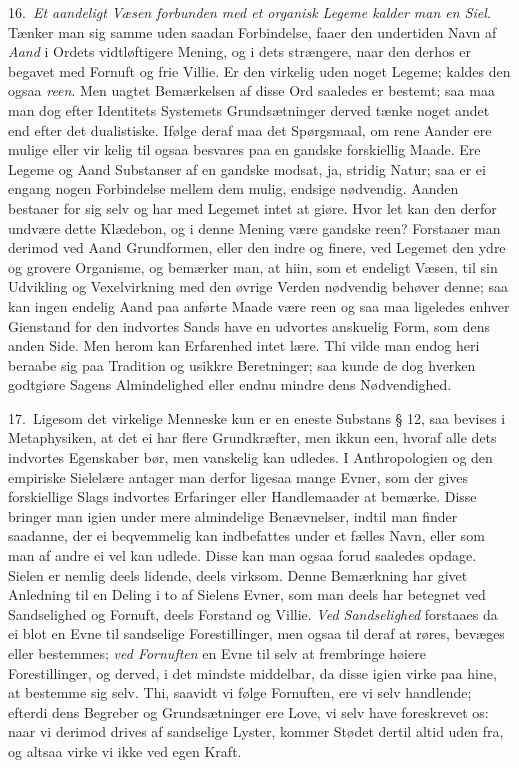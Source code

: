 \documentclass[12pt,a4paper]{article}
\newcommand{\opage}[1]{\marginnote{\footnotesize\textit{[#1]}}}
\begin{document}
16.~\emph{Et aandeligt Væsen forbunden med et organisk Legeme kalder man en Siel.}
Tænker man sig samme uden saadan Forbindelse, faaer den undertiden Navn af
\emph{Aand} i Ordets vidtløftigere Mening, og i dets strængere, naar den derhos er
begavet med Fornuft og frie Villie. Er den virkelig uden noget Legeme; kaldes den
ogsaa \emph{reen}. Men uagtet Bemærkelsen af disse Ord saaledes er bestemt; saa maa
man dog efter Identitets Systemets Grundsætninger derved tænke noget andet end
efter det dualistiske. Ifølge deraf maa det Spørgsmaal, om rene Aander ere mulige
eller vir%
\opage{30}kelig til ogsaa besvares paa en gandske forskiellig Maade. Ere Legeme og Aand
Substanser af en gandske modsat, ja, stridig Natur; saa er ei engang nogen
Forbindelse mellem dem mulig, endsige nødvendig. Aanden bestaaer for sig selv og
har med Legemet intet at giøre. Hvor let kan den derfor undvære dette Klædebon, og
i denne Mening være gandske reen? Forstaaer man derimod ved Aand Grundformen, eller
den indre og finere, ved Legemet den ydre og grovere Organisme, og bemærker man, at
hiin, som et endeligt Væsen, til sin Udvikling og Vexelvirkning med den øvrige
Verden nødvendig behøver denne; saa kan ingen endelig Aand paa anførte Maade være
reen og saa maa ligeledes enhver Gienstand for den indvortes Sands have en udvortes
anskuelig Form, som dens anden Side. Men herom kan Erfarenhed intet lære. Thi vilde
man endog heri beraabe sig paa Tradition og usikkre Beretninger; saa kunde de dog
hverken godtgiøre Sagens Almindelighed eller endnu mindre dens Nødvendighed.

17.~Ligesom det virkelige Menneske kun er en eneste Substans § 12, saa bevises i
Metaphysiken, at det ei har flere Grundkræfter, men ikkun een, hvoraf alle dets
indvortes Egenskaber bør, men vanskelig kan udledes. I Anthropologien og den
empiriske Sielelære antager man derfor ligesaa mange Evner, som der gives
forskiellige Slags indvortes Erfaringer eller Handlemaader at bemærke. Disse
bringer man igien under mere
\opage{31} almindelige Benævnelser, indtil man finder saadanne, der ei beqvemmelig kan
indbefattes under et fælles Navn, eller som man af andre ei vel kan udlede. Disse
kan man ogsaa forud saaledes opdage. Sielen er nemlig deels lidende, deels
virksom. Denne Bemærkning har givet Anledning til en Deling i to af Sielens Evner,
som man deels har betegnet ved Sandselighed og Fornuft, deels Forstand og Villie.
\emph{Ved Sandselighed} forstaaes da ei blot en Evne til sandselige
Forestillinger, men ogsaa til deraf at røres, bevæges eller bestemmes; \emph{ved
Fornuften} en Evne til selv at frembringe høiere Forestillinger, og derved, i det
mindste middelbar, da disse igien virke paa hine, at bestemme sig selv. Thi,
saavidt vi følge Fornuften, ere vi selv handlende; efterdi dens Begreber og
Grundsætninger ere Love, vi selv have foreskrevet os: naar vi derimod drives af
sandselige Lyster, kommer Stødet dertil altid uden fra, og altsaa virke vi ikke
ved egen Kraft.
\end{document}
